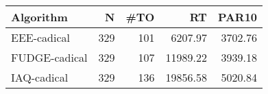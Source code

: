 \begin{tabular}{lrrrr}
\toprule
    Algorithm &   N &  \#TO &       RT &   PAR10 \\
\midrule
  EEE-cadical & 329 &  101 &  6207.97 & 3702.76 \\
FUDGE-cadical & 329 &  107 & 11989.22 & 3939.18 \\
  IAQ-cadical & 329 &  136 & 19856.58 & 5020.84 \\
\bottomrule
\end{tabular}
